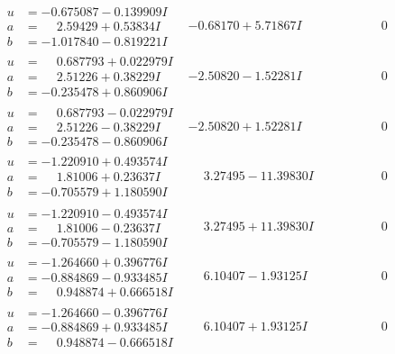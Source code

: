 \documentclass[1p]{elsarticle_modified}
\theoremstyle{definition}
\begin{document}
$$\begin{array}{c|c|c}
\begin{aligned}
u &= -0.675087 - 0.139909 I \\
a &= \phantom{-}2.59429 + 0.53834 I \\
b &= -1.017840 - 0.819221 I\end{aligned}
 & -0.68170 + 5.71867 I & \phantom{-0.000000 } 0 \\ \hline\begin{aligned}
u &= \phantom{-}0.687793 + 0.022979 I \\
a &= \phantom{-}2.51226 + 0.38229 I \\
b &= -0.235478 + 0.860906 I\end{aligned}
 & -2.50820 - 1.52281 I & \phantom{-0.000000 } 0 \\ \hline\begin{aligned}
u &= \phantom{-}0.687793 - 0.022979 I \\
a &= \phantom{-}2.51226 - 0.38229 I \\
b &= -0.235478 - 0.860906 I\end{aligned}
 & -2.50820 + 1.52281 I & \phantom{-0.000000 } 0 \\ \hline\begin{aligned}
u &= -1.220910 + 0.493574 I \\
a &= \phantom{-}1.81006 + 0.23637 I \\
b &= -0.705579 + 1.180590 I\end{aligned}
 & \phantom{-}3.27495 - 11.39830 I & \phantom{-0.000000 } 0 \\ \hline\begin{aligned}
u &= -1.220910 - 0.493574 I \\
a &= \phantom{-}1.81006 - 0.23637 I \\
b &= -0.705579 - 1.180590 I\end{aligned}
 & \phantom{-}3.27495 + 11.39830 I & \phantom{-0.000000 } 0 \\ \hline\begin{aligned}
u &= -1.264660 + 0.396776 I \\
a &= -0.884869 - 0.933485 I \\
b &= \phantom{-}0.948874 + 0.666518 I\end{aligned}
 & \phantom{-}6.10407 - 1.93125 I & \phantom{-0.000000 } 0 \\ \hline\begin{aligned}
u &= -1.264660 - 0.396776 I \\
a &= -0.884869 + 0.933485 I \\
b &= \phantom{-}0.948874 - 0.666518 I\end{aligned}
 & \phantom{-}6.10407 + 1.93125 I & \phantom{-0.000000 } 0 \\ \hline\begin{aligned}

\end{aligned}
\end{array}$$
\end{document}
